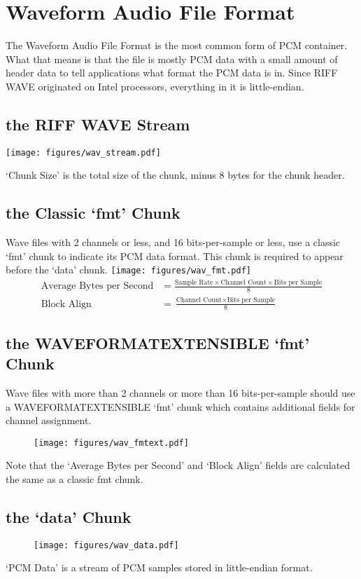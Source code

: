 \chapter{Waveform Audio File Format}
The Waveform Audio File Format is the most common form of PCM container.
What that means is that the file is mostly PCM data with a
small amount of header data to tell applications what format the
PCM data is in.
Since RIFF WAVE originated on Intel processors, everything in it
is little-endian.
\section{the RIFF WAVE Stream}
\texttt{[image: figures/wav\_stream.pdf]}
\par
\noindent
`Chunk Size' is the total size of the chunk, minus
8 bytes for the chunk header.
\section{the Classic `fmt' Chunk}
Wave files with 2 channels or less, and 16 bits-per-sample or less,
use a classic `fmt' chunk to indicate its PCM data format.
This chunk is required to appear before the `data' chunk.
\texttt{[image: figures/wav\_fmt.pdf]}
\begin{align}
\text{Average Bytes per Second} &= \frac{\text{Sample Rate}
  \times \text{Channel Count} \times \text{Bits per Sample}}{8} \\
\text{Block Align} &= \frac{\text{Channel Count} \times \text{Bits per Sample}}{8}
\end{align}
\section{the WAVEFORMATEXTENSIBLE `fmt' Chunk}
Wave files with more than 2 channels or more than 16 bits-per-sample
should use a WAVEFORMATEXTENSIBLE `fmt' chunk which contains
additional fields for channel assignment.
\begin{figure}[h]
\texttt{[image: figures/wav\_fmtext.pdf]}
\end{figure}
\par
\noindent
Note that the `Average Bytes per Second' and `Block Align' fields
are calculated the same as a classic fmt chunk.

\section{the `data' Chunk}
\begin{figure}[h]
\texttt{[image: figures/wav\_data.pdf]}
\end{figure}
\par
\noindent
`PCM Data' is a stream of PCM samples stored in little-endian format.

